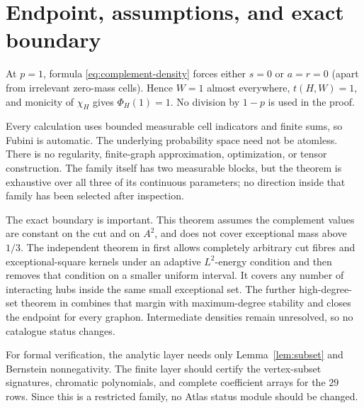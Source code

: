 \documentclass[11pt]{article}
\begin{document}
\section{Endpoint, assumptions, and exact boundary}

At $p=1$, formula \eqref{eq:complement-density} forces either $s=0$ or
$a=r=0$ (apart from irrelevant zero-mass cells).  Hence $W=1$ almost
everywhere, $t(H,W)=1$, and monicity of $\chi_H$ gives
$\Phi_H(1)=1$.  No division by $1-p$ is used in the proof.

Every calculation uses bounded measurable cell indicators and finite sums,
so Fubini is automatic.  The underlying probability space need not be
atomless.  There is no regularity, finite-graph approximation, optimization,
or tensor construction.  The family itself has two measurable blocks, but
the theorem is exhaustive over all three of its continuous parameters; no
direction inside that family has been selected after inspection.

The exact boundary is important.  This theorem assumes the complement values
are constant on the cut and on $A^2$, and does not cover exceptional mass
above $1/3$.  The independent theorem in
 first allows
completely arbitrary cut fibres and exceptional-square kernels under an
adaptive $L^2$-energy condition and then removes that condition on a smaller
uniform interval.  It covers any number of interacting hubs inside the same
small exceptional set.  The further high-degree-set theorem in
 combines that
margin with maximum-degree stability and closes the endpoint for every
graphon.  Intermediate densities remain unresolved, so no catalogue status
changes.

For formal verification, the analytic layer needs only
Lemma~\ref{lem:subset} and Bernstein nonnegativity.  The finite layer should
certify the vertex-subset signatures, chromatic polynomials, and complete
coefficient arrays for the $29$ rows.  Since this is a restricted family, no
Atlas status module should be changed.
\end{document}
